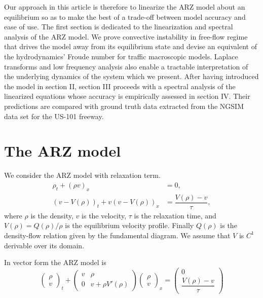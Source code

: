 \documentclass[letterpaper, 10 pt, conference]{ieeeconf}  %
\begin{document}
Our approach in this article is therefore to linearize the ARZ model about an equilibrium so as to make the best of a trade-off between model accuracy and ease of use. The first section is dedicated to the linearization and spectral analysis of the ARZ model. We prove convective instability in free-flow regime that drives the model away from its equilibrium  state and devise an equivalent of the hydrodynamics' Froude number for traffic macroscopic models. Laplace transforms and low frequency analysis also enable a tractable interpretation of the underlying dynamics of the system which we present. After having introduced the model in section II, section III proceeds with a spectral analysis of the linearized equations whose accuracy is empirically assessed in section IV. Their predictions are compared with ground truth data extracted from the NGSIM data set for the US-101 freeway.

\section{The ARZ model} \label{ARZSection}
We consider the ARZ model with relaxation term.
\begin{align} 
\rho_t + (\rho v)_x &= 0, \label{ARZ1} \\
(v - V(\rho))_t + v(v - V(\rho))_x &=\dfrac{V(\rho) - v}{\tau} \label{ARZ2},
\end{align}
where $\rho$ is the density, $v$ is the velocity, $\tau$ is the relaxation time, and $V(\rho) = Q(\rho)/\rho$ is the equilibrium velocity profile. Finally $Q(\rho)$ is the density-flow relation given by the fundamental diagram. We assume that $V$ is $C^{1}$ derivable over its domain.

In vector form the ARZ model is
{\footnotesize
\begin{equation} \label{ARZrhov}
\begin{pmatrix}
	\rho \\
	v
\end{pmatrix}_t
+ 
\begin{pmatrix}
	v & \rho \\
	0 & v + \rho V' (\rho)
\end{pmatrix}
\begin{pmatrix}
	\rho \\ 
	v
\end{pmatrix}_x = 
\begin{pmatrix}
	0 \\ 
	\dfrac{V(\rho) - v}{\tau}
\end{pmatrix}
\end{equation}
}
\end{document}
